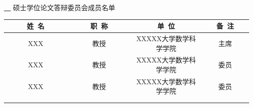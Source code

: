 \thispagestyle{empty}
\vspace*{2em}

\makeatletter
\begin{center}\STSong{}
\underline{\ \@cauthor\ } 硕士学位论文答辩委员会成员名单
\end{center}
\makeatother

\begin{center}
\renewcommand{\arraystretch}{1.4}
\begin{tabular}{|c|c|c|c|}\hline
~~~~~姓~名~~~~~ & ~~~~~职~称~~~~~ & \hspace{6em}单~位\hspace{6em} & ~~~备~注~~~\\\hline
XXX & 教授 & XXXXX大学数学科学学院 & 主席 \\\hline
XXX & 教授 & XXXXX大学数学科学学院 & 委员 \\\hline
XXX & 教授 & XXXXX大学数学科学学院 & 委员 \\\hline
 &  &  &  \\\hline
 &  &  &  \\\hline
\end{tabular}
\end{center}
